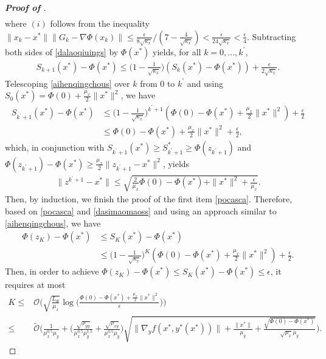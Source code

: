 \documentclass{osudissert96}
\begin{document}
\begin{proof}[{\bf Proof of }]
\begin{align}
\end{align} 
where $(i)$ follows from the inequality $\|x_k-x^*\|\|G_k-\nabla\Phi(x_k)\|\leq  \frac{\epsilon}{8\sqrt{\kappa_x}}/(7-\frac{4}{\sqrt{\kappa_x}})<\frac{\epsilon}{24\sqrt{\kappa_x}}<\frac{\epsilon}{4}$. Subtracting both sides of \cref{dalaoqiuings} by $\Phi(x^*)$ yields, for all $k=0,...,k^\prime$,
\begin{align}\label{aihenqingchous}
S_{k+1}(x^*) - \Phi(x^*) \leq \Big(1 -\frac{1}{\sqrt{\kappa_x}} \Big)(S_{k}(x^*)-\Phi(x^*)) +\frac{\epsilon}{2\sqrt{\kappa_x}}.
\end{align}
Telescoping \cref{aihenqingchous} over $k$ from $0$ to $k^\prime$ and using $S_0(x^*) = \Phi(0)+\frac{\mu_x}{2} \|x^*\|^2$, we have 
\begin{align*}
S_{k^\prime+1}(x^*) - \Phi(x^*) &\leq  \Big(1 -\frac{1}{\sqrt{\kappa_x}} \Big)^{k^\prime+1}( \Phi(0) -\Phi(x^*)+\frac{\mu_x}{2} \|x^*\|^2)+\frac{\epsilon}{2} 
\\&\leq \Phi(0) -\Phi(x^*)+\frac{\mu_x}{2} \|x^*\|^2+\frac{\epsilon}{2},
\end{align*} 
which, in conjunction with $S_{k^\prime+1}(x^*)\geq S_{k^\prime+1}^*\geq \Phi(z_{k^\prime+1})$ and $\Phi(z_{k^\prime+1})-\Phi(x^*)\geq \frac{\mu_x}{2}\|z_{k^\prime+1}-x^*\|^2$, yields
\begin{align*}
\|z^{k^\prime+1}-x^*\|\leq \sqrt{\frac{2}{\mu_x}\Phi(0) -\Phi(x^*)+\|x^*\|^2+\frac{\epsilon}{\mu_x}}.
\end{align*}
Then, by induction, we finish the proof of the first item \cref{pocasca}.  Therefore, based on  \cref{pocasca} and \cref{dasimaomaoss} and using an approach similar to \cref{aihenqingchous}, we have
\begin{align}\label{heiyeibaizhoussc}
\Phi(z_K)- \Phi(x^*)&\leq S_{K}(x^*) - \Phi(x^*) \nonumber
\\&\leq \Big(1 -\frac{1}{\sqrt{\kappa_x}} \Big)^{K}(\Phi(0) -\Phi(x^*)+\frac{\mu_x}{2} \|x^*\|^2) +\frac{\epsilon}{2}.
\end{align}
Then, in order to achieve $\Phi(z_K)- \Phi(x^*)\leq S_{K}(x^*) - \Phi(x^*) \leq \epsilon$, it requires at most 
{\footnotesize
\begin{align}\label{anqilababascs}
K \leq& \mathcal{O}\Big( \sqrt{\frac{L_\Phi}{\mu_x}}\log\Big(\frac{\Phi(0) -\Phi(x^*)+\frac{\mu_x}{2} \|x^*\|^2}{\epsilon}\Big)\Big) \nonumber
\\\leq& \mathcal{\widetilde O}\Big(\frac{1}{\mu_x^{0.5}\mu_y}+\Big(\frac{ \sqrt{\rho_{yy}}}{\mu_x^{0.5}\mu_y^{1.5}} +  \frac{\sqrt{\rho_{xy}}}{\mu_x^{0.5}\mu_y}\Big)\sqrt{\|\nabla_y f( x^*,y^*(x^*))\|+\frac{\|x^*\|}{\mu_y}+\frac{\sqrt{\Phi(0)-\Phi(x^*)}}{\sqrt{\mu_x}\mu_y}}\Big). 

\end{align}}
\end{proof}
\end{document}
